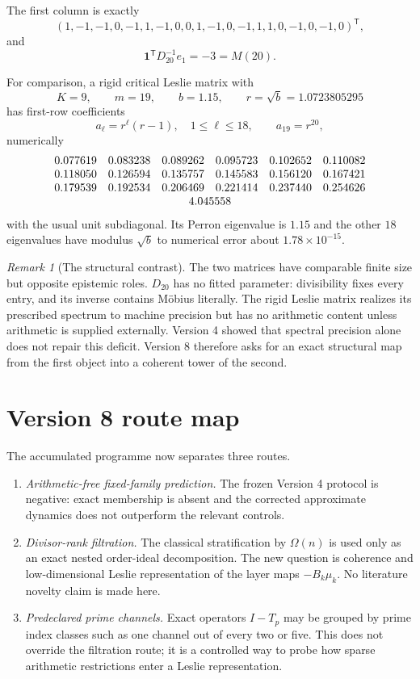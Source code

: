 \documentclass[11pt]{amsart}
\numberwithin{equation}{section}
\theoremstyle{plain}
\theoremstyle{definition}
\theoremstyle{remark}
\newtheorem{remark}[theorem]{Remark}
\begin{document}
The first column is exactly
\[
(1,-1,-1,0,-1,1,-1,0,0,1,-1,0,-1,1,1,0,-1,0,-1,0)^{\mathsf T},
\]
and
\[
\mathbf 1^{\mathsf T}D_{20}^{-1}e_1=-3=M(20).
\]

For comparison, a rigid critical Leslie matrix with
\[
K=9,\qquad m=19,\qquad b=1.15,\qquad r=\sqrt b=1.0723805295
\]
has first-row coefficients
\[
a_\ell=r^\ell(r-1),\quad 1\le\ell\le18,
\qquad
a_{19}=r^{20},
\]
numerically
\[
\begin{array}{rrrrrr}
0.077619&0.083238&0.089262&0.095723&0.102652&0.110082\\
0.118050&0.126594&0.135757&0.145583&0.156120&0.167421\\
0.179539&0.192534&0.206469&0.221414&0.237440&0.254626\\
\multicolumn{6}{c}{4.045558}
\end{array}
\]
with the usual unit subdiagonal.  Its Perron eigenvalue is $1.15$ and the other $18$ eigenvalues
have modulus $\sqrt b$ to numerical error about $1.78\times10^{-15}$.

\begin{remark}[The structural contrast]
\label{rem:D_vs_L_contrast}
The two matrices have comparable finite size but opposite epistemic roles.  $D_{20}$ has no
fitted parameter: divisibility fixes every entry, and its inverse contains M\"obius literally.
The rigid Leslie matrix realizes its prescribed spectrum to machine precision but has no
arithmetic content unless arithmetic is supplied externally.  Version 4 showed that spectral
precision alone does not repair this deficit.  Version 8 therefore asks for an exact structural
map from the first object into a coherent tower of the second.
\end{remark}


\section{Version 8 route map}
\label{sec:v8_route_map}

The accumulated programme now separates three routes.

\begin{enumerate}
\item[\texttt{[CLOSED]}]
\emph{Arithmetic-free fixed-family prediction.}
The frozen Version 4 protocol is negative: exact membership is absent and the corrected
approximate dynamics does not outperform the relevant controls.

\item[\texttt{[ADAPT]}]
\emph{Divisor-rank filtration.}
The classical stratification by $\Omega(n)$ is used only as an exact nested order-ideal
decomposition.  The new question is coherence and low-dimensional Leslie representation of the
layer maps $-B_k\mu_k$.  No literature novelty claim is made here.

\item[\texttt{[SIDE]}]
\emph{Predeclared prime channels.}
Exact operators $I-T_p$ may be grouped by prime index classes such as one channel out of every
two or five.  This does not override the filtration route; it is a controlled way to probe how
sparse arithmetic restrictions enter a Leslie representation.
\end{enumerate}
\end{document}
